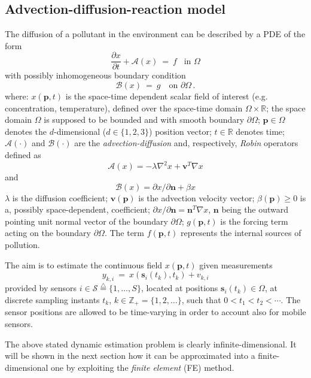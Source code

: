 \documentclass[journal]{IEEEtran}
\newcommand{\defi} { \stackrel{\bigtriangleup}{=} }
\newcommand{\mb}{\mathbf}
\newcommand{\be}{\begin{equation}}
\newcommand{\ee}{\end{equation}}
\newcommand{\Z}{{\mathbb Z}}
\begin{document}
\subsection{Advection-diffusion-reaction model}
The diffusion of a pollutant in the environment can be described by a PDE of the form
	\be
	\displaystyle{\frac{\partial x}{\partial t}} +  \mathcal{A}(x) ~=~ f \,\,\,\,\, \mbox{in } \Omega
	\label{PDE}
	\ee
	with possibly inhomogeneous boundary condition
	\be
	\mathcal B (x) ~=~ g \,\,\,\, \mbox{ on } \partial \Omega\, .
	\label{boundary}
	\ee
	where:
	$x(\mb{p},t)$ is the space-time dependent scalar field of interest (e.g. concentration, temperature), defined over the space-time domain
	$\Omega \times \mathbb{R}$; 
	the space domain $\Omega$ is supposed to be bounded and with smooth boundary $ \partial \Omega$; 
	$\mb{p} \in \Omega$ denotes the $d$-dimensional ($d \in \{ 1, 2, 3 \}$) position vector;
	$t \in \mathbb{R}$ denotes time;
	$\mathcal{A}(\cdot)$ and $\mathcal{B}(\cdot)$ are the \textit{advection-diffusion} and, respectively, \textit{Robin} operators defined as
	\[
	\mathcal{A}(x) = - \lambda \nabla^2 x + \mb{v}^T \nabla x 
	\] 
	and 
	\[
	\mathcal{B}(x) =  {\partial x}/{\partial \mb{n}} + \beta x
	\]
	$\lambda$ is the diffusion coefficient;
	$\mb{v}(\mb{p})$ is the advection velocity vector;
	$\beta(\mb{p}) \geq 0$ is a, possibly space-dependent, coefficient; 
	$ {\partial x}/{\partial \mb{n}} = \mb{n}^T \nabla x$,
	$\mb{n}$ being the outward pointing unit normal vector of the boundary 
	$\partial \Omega$;
	$g(\mb{p},t)$ is the forcing term  acting on the boundary $\partial \Omega$.
	The term $f(\mb{p},t)$ represents the internal sources of pollution.
	 
	The aim is to estimate the continuous field $x(\mb{p},t)$ given measurements
	\be
	y_{k,i} ~=~  x \left( \mb{s}_i (t_k), t_k \right)  + v_{k,i}
	\label{meas}
	\ee
	provided by sensors $i \in \mathcal{S} \defi \{ 1, \dots, S \}$, located at positions $\mb{s}_i (t_k) \in \Omega$, at discrete sampling instants $t_k$, $k \in
	\Z_+ = \{ 1, 2, \dots \}$, such that $0 < t_1 < t_2 < \cdots$. The sensor positions are allowed to be time-varying in order to account also for mobile sensors.
	
	The above stated dynamic estimation problem is clearly infinite-dimensional.
	It will be shown in the next section how it can be approximated into a finite-dimensional one by exploiting the \textit{finite element} (FE) method.
	
\end{document}
